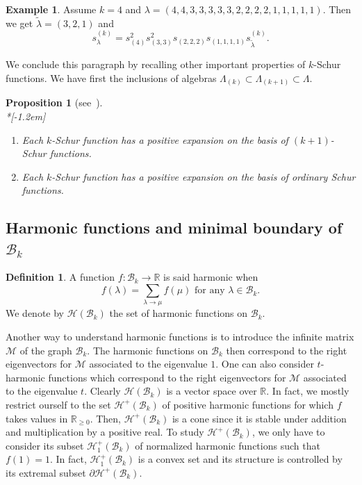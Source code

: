 \documentclass[10pt,a4paper]{amsart}
\newtheorem{prop}[theorem]{Proposition}
\theoremstyle{definition}
\newtheorem{defi}[theorem]{Definition}
\newtheorem{exam}[theorem]{Example}
\begin{document}
\begin{exam}
Assume $k=4$ and $\lambda=(4,4,3,3,3,3,3,2,2,2,2,1,1,1,1,1)$. Then we get
$\widetilde{\lambda}=(3,2,1)$ and
\[
s_{\lambda}^{(k)}=s_{(4)}^{2}s_{(3,3)}^{2}s_{(2,2,2)}s_{(1,1,1,1)}%
s_{\widetilde{\lambda}}^{(k)}.
\]

\end{exam}

We conclude this paragraph by recalling other important properties of
$k$-Schur functions. We have first the inclusions of algebras $\Lambda
_{(k)}\subset\Lambda_{(k+1)}\subset\Lambda$.

\begin{prop}
[{see~\cite[Section~4]{LLMSSZ}}] \label{Prop_positiveExp}\ \\*[-1.2em] 

\begin{enumerate}
\item Each $k$-Schur function has a positive expansion on the basis of
$(k+1)$-Schur functions.

\item Each $k$-Schur function has a positive expansion on the basis of
ordinary Schur functions.
\end{enumerate}
\end{prop}

\subsection{Harmonic functions and minimal boundary of \texorpdfstring{$\mathcal{B}_{k}$}{Bk}}

\begin{defi}
A function $f:\mathcal{B}_{k}\rightarrow\mathbb{R}$ is said harmonic when
\[
f(\lambda)=\sum_{\lambda\rightarrow\mu}f(\mu)\text{ for any }\lambda
\in\mathcal{B}_{k}.
\]
We denote by $\mathcal{H}(\mathcal{B}_{k})$ the set of harmonic functions on
$\mathcal{B}_{k}$.
\end{defi}

Another way to understand harmonic functions is to introduce the infinite
matrix $\mathcal{M}$ of the graph $\mathcal{B}_{k}$. The harmonic functions on
$\mathcal{B}_{k}$ then correspond to the right eigenvectors for $\mathcal{M}$
associated to the eigenvalue $1$. One can also consider $t$-harmonic functions
which correspond to the right eigenvectors for $\mathcal{M}$ associated to the
eigenvalue $t$. Clearly $\mathcal{H}(\mathcal{B}_{k})$ is a vector space over
$\mathbb{R}$. In fact, we mostly restrict ourself to the set $\mathcal{H}%
^{+}(\mathcal{B}_{k})$ of positive harmonic functions for which $f$ takes
values in $\mathbb{R}_{\geq0}$. Then, $\mathcal{H}^{+}(\mathcal{B}_{k})$ is a
cone since it is stable under addition and multiplication by a positive real. To
study $\mathcal{H}^{+}(\mathcal{B}_{k})$, we only have to consider its subset
$\mathcal{H}_{1}^{+}(\mathcal{B}_{k})$ of normalized harmonic functions such
that $f(1)=1$. In fact, $\mathcal{H}_{1}^{+}(\mathcal{B}_{k})$ is a convex set
and its structure is controlled by its extremal subset $\partial
\mathcal{H}^{+}(\mathcal{B}_{k})$.
\end{document}
